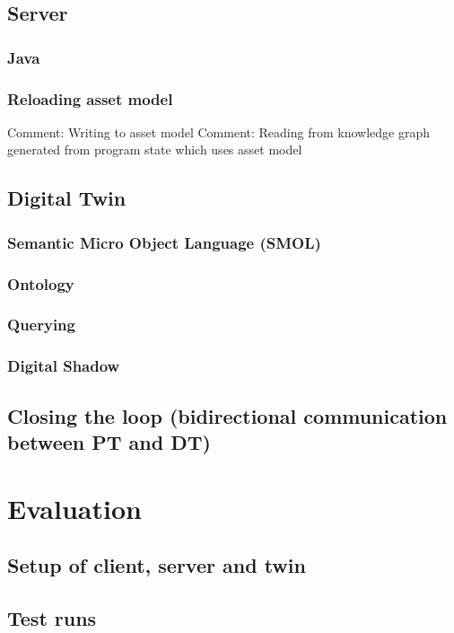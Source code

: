 \documentclass{article}
\begin{document}
\subsection{Server}
\subsubsection{Java}
\subsubsection{Reloading asset model}
Comment: Writing to asset model
Comment: Reading from knowledge graph generated from program state which uses asset model


\subsection{Digital Twin}
\subsubsection{Semantic Micro Object Language (SMOL)}
\subsubsection{Ontology}
\subsubsection{Querying}
\subsubsection{Digital Shadow}



\subsection{Closing the loop (bidirectional communication between PT and DT)}




\newpage
\section{Evaluation}\label{sec:Evaluation}
\subsection{Setup of client, server and twin}
\subsection{Test runs}
\end{document}
